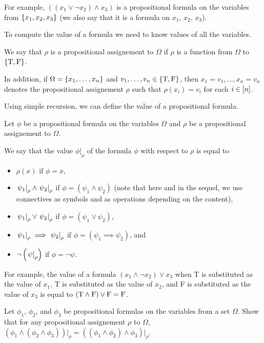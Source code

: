 For example, $((x_1 \lor \lnot x_2) \land x_3)$ is a propositional formula on
the variables from $\set{x_1, x_2, x_3}$ (we also say that it is a formula on
$x_1$, $x_2$, $x_3$).

To compute the value of a formula we need to know values of all the variables.
\begin{definition}
  We say that $\rho$ is a propositional assignement to $\Omega$ if $\rho$
  is a function from $\Omega$ to $\set{\ltrue, \lfalse}$.

  In addition, if $\Omega = \set{x_1, \dots, x_n}$ and
  $v_1, \dots, v_n \in \set{\ltrue, \lfalse}$, then
  $x_1 = v_1, \dots, x_n = v_n$ denotes the propositional assignement
  $\rho$ such that $\rho(x_i) = v_i$ for each $i \in [{n}]$.
\end{definition}

Using simple recursion, we can define the value of a propositional formula.
\begin{definition}
  Let $\phi$ be a propositional formula on the variables $\Omega$ and
  $\rho$ be a propositional assignement to $\Omega$.

  We say that the value $\phi\big\rvert_\rho$ of the
  formula $\phi$ with respect to $\rho$ is equal to
  \begin{itemize}
    \item $\rho(x)$ if $\phi = x$,
    \item $\left. {\psi_1} \right\rvert_{\rho} \land
      \left. {\psi_2} \right\rvert_{\rho}$ if
      $\phi = (\psi_1 \land \psi_2)$ (note that here and in the
      sequel, we use connectives as symbols and as operations depending on
      the content),
    \item $\left. {\psi_1} \right\rvert_{\rho} \lor
      \left. {\psi_2} \right\rvert_{\rho}$ if
      $\phi = (\psi_1 \lor \psi_2)$,
    \item $\left. {\psi_1} \right\rvert_{\rho} \implies
      \left. {\psi_2} \right\rvert_{\rho}$ if
      $\phi = (\psi_1 \implies \psi_2)$, and
    \item $\lnot\left(\left. {\psi} \right\rvert_{\rho}\right)$
      if $\phi = \lnot \psi$.
  \end{itemize}
\end{definition}

For example, the value of a formula $(x_1 \land \lnot x_2) \lor x_3$ when T is
substituted as the value of $x_1$, T is substituted as the value of $x_2$,
and F is substituted as the value of $x_3$ is equal to
$(\text{T} \land \text{F}) \lor \text{F} = \text{F}$.

\begin{exercise}
  Let $\phi_1$, $\phi_2$, and $\phi_3$ be propositional formulas on the
  variables from a set $\Omega$. Show that for any propositional assignement
  $\rho$ to $\Omega$,
  $(\phi_1 \land (\phi_2 \land \phi_3))\big\rvert_\rho =
   ((\phi_1 \land \phi_2) \land \phi_3)\big\rvert_\rho$.
\end{exercise}

